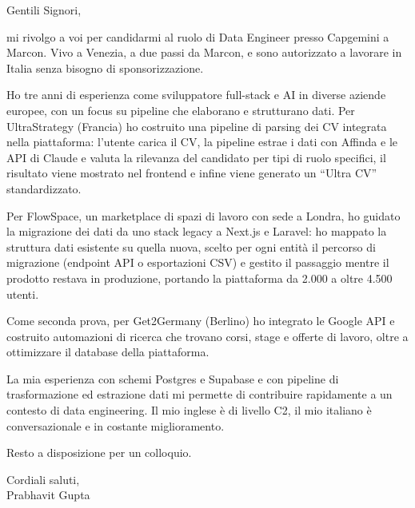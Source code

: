 \documentclass[a4paper,11pt]{article}
\begin{document}
Gentili Signori,

mi rivolgo a voi per candidarmi al ruolo di Data Engineer presso Capgemini a Marcon. Vivo a Venezia, a due passi da Marcon, e sono autorizzato a lavorare in Italia senza bisogno di sponsorizzazione.

Ho tre anni di esperienza come sviluppatore full-stack e AI in diverse aziende europee, con un focus su pipeline che elaborano e strutturano dati. Per UltraStrategy (Francia) ho costruito una pipeline di parsing dei CV integrata nella piattaforma: l'utente carica il CV, la pipeline estrae i dati con Affinda e le API di Claude e valuta la rilevanza del candidato per tipi di ruolo specifici, il risultato viene mostrato nel frontend e infine viene generato un ``Ultra CV'' standardizzato.

Per FlowSpace, un marketplace di spazi di lavoro con sede a Londra, ho guidato la migrazione dei dati da uno stack legacy a Next.js e Laravel: ho mappato la struttura dati esistente su quella nuova, scelto per ogni entità il percorso di migrazione (endpoint API o esportazioni CSV) e gestito il passaggio mentre il prodotto restava in produzione, portando la piattaforma da 2.000 a oltre 4.500 utenti.

Come seconda prova, per Get2Germany (Berlino) ho integrato le Google API e costruito automazioni di ricerca che trovano corsi, stage e offerte di lavoro, oltre a ottimizzare il database della piattaforma.

La mia esperienza con schemi Postgres e Supabase e con pipeline di trasformazione ed estrazione dati mi permette di contribuire rapidamente a un contesto di data engineering. Il mio inglese è di livello C2, il mio italiano è conversazionale e in costante miglioramento.

Resto a disposizione per un colloquio.

Cordiali saluti,\\
Prabhavit Gupta
\end{document}
